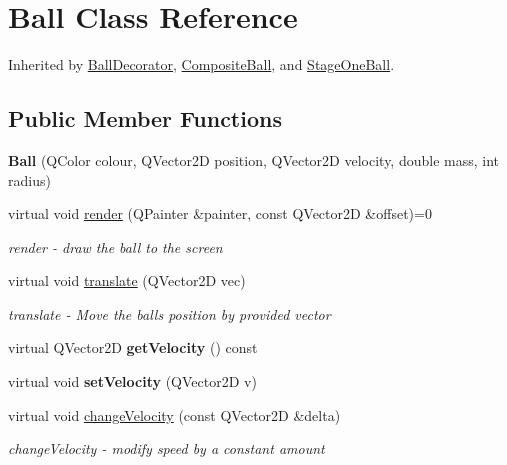 \hypertarget{class_ball}{}\section{Ball Class Reference}
\label{class_ball}


Inherited by \mbox{\hyperlink{class_ball_decorator}{Ball\+Decorator}}, \mbox{\hyperlink{class_composite_ball}{Composite\+Ball}}, and \mbox{\hyperlink{class_stage_one_ball}{Stage\+One\+Ball}}.

\subsection*{Public Member Functions}
\begin{DoxyCompactItemize}
\item 
\mbox{\label{class_ball_a81d492bd26dc3b4583da0b709375bbac}} 
{\bfseries Ball} (Q\+Color colour, Q\+Vector2D position, Q\+Vector2D velocity, double mass, int radius)
\item 
virtual void \mbox{\hyperlink{class_ball_a307773aaa59aee90cef8767b0c22deca}{render}} (Q\+Painter \&painter, const Q\+Vector2D \&offset)=0
\begin{DoxyCompactList}\small\item\em render -\/ draw the ball to the screen \end{DoxyCompactList}\item 
virtual void \mbox{\hyperlink{class_ball_a88546ffd1a37b301a5c7085f3eabe8f0}{translate}} (Q\+Vector2D vec)
\begin{DoxyCompactList}\small\item\em translate -\/ Move the ball\textquotesingle{}s position by provided vector \end{DoxyCompactList}\item 
\mbox{\label{class_ball_a016798bb733965c67e70b8abfc661e5b}} 
virtual Q\+Vector2D {\bfseries get\+Velocity} () const
\item 
\mbox{\label{class_ball_a2067db4efee62b1ff618b782fc93818c}} 
virtual void {\bfseries set\+Velocity} (Q\+Vector2D v)
\item 
virtual void \mbox{\hyperlink{class_ball_add51f90f60cb862daa8f3f7aa743f933}{change\+Velocity}} (const Q\+Vector2D \&delta)
\begin{DoxyCompactList}\small\item\em change\+Velocity -\/ modify speed by a constant amount \end{DoxyCompactList}\item 

\end{DoxyCompactItemize}
